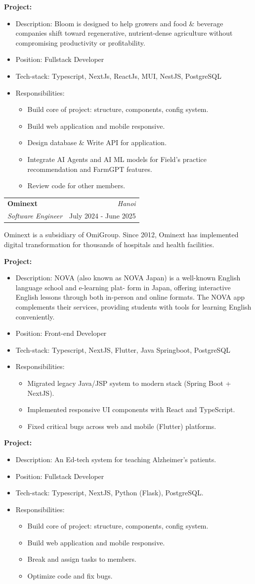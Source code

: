 \documentclass[a4paper, 11pt]{article}
\makeatletter
\newcommand{\resumeSubheading}[4]{
\vspace{0.5mm}
\item
\begin{tabular*}{0.98\textwidth}[t]{l@{\extracolsep{\fill}}r}
	\textbf{#1}                & \textit{\footnotesize{#4}} \\
	\textit{\footnotesize{#3}} & \footnotesize{#2}          \\
\end{tabular*}
\vspace{-2.4mm}
}
\newcommand{\projectHeading}[1]{%
\textbf{Project:} \text{#1}%
\vspace{-3.0mm}%
}
\newcommand{\responsibilities}{%
\item{Responsibilities:}%
\begin{itemize}[leftmargin=6ex,noitemsep,labelsep=1mm,itemsep=0mm,label={·}]\small%
}
\newcommand{\responsibilitiesEnd}{\end{itemize}}
\newcommand{\companyDesc}[1]{%
\vspace{4.0mm}%
#1%
\vspace{2.0mm}%
}
\newcommand{\resumeItemListStart}{\begin{justify}\begin{itemize}[leftmargin=3ex,
rightmargin=2ex, noitemsep,labelsep=1.2mm,itemsep=0mm]\small}
\newcommand{\resumeItemListEnd}{\end{itemize}\end{justify}
\vspace{-2mm}}
\makeatother
\begin{document}
\projectHeading{Bloomtech}
\resumeItemListStart
\item {Description: Bloom is designed to help growers and food \& beverage companies
            shift toward regenerative, nutrient-dense agriculture without compromising
            productivity or profitability.}
\item {Position: Fullstack Developer}
\item {Tech-stack: Typescript, NextJs, ReactJs, MUI, NestJS, PostgreSQL}
\responsibilities
\item {Build core of project: structure, components, config system.}
\item {Build web application and mobile responsive.}
\item {Design database \& Write API for application.}
\item {Integrate AI Agents and AI ML models for Field's practice recommendation and FarmGPT features.}
\item {Review code for other members.}
\responsibilitiesEnd
\resumeItemListEnd
\vspace{3.0mm}

\resumeSubheading{Ominext}{July 2024 - June 2025}{Software Engineer}{Hanoi}
\companyDesc{
	Ominext is a subsidiary of OmiGroup. Since 2012, Ominext has implemented digital
	transformation for thousands of hospitals and health facilities.
}

\projectHeading{NOVA}
\resumeItemListStart
\item {Description: NOVA (also known as NOVA Japan) is a well-known English language school and e-learning plat-
            form in Japan, offering interactive English lessons through both in-person and online formats. The NOVA app
            complements their services, providing students with tools for learning English conveniently.}
\item {Position: Front-end Developer}
\item {Tech-stack: Typescript, NextJS, Flutter, Java Springboot, PostgreSQL}
\responsibilities
\item {Migrated legacy Java/JSP system to modern stack (Spring Boot + NextJS).}
\item {Implemented responsive UI components with React and TypeScript.}
\item {Fixed critical bugs across web and mobile (Flutter) platforms.}
\responsibilitiesEnd
\resumeItemListEnd
\projectHeading{MTB}
\resumeItemListStart
\item {Description: An Ed-tech system for teaching Alzheimer's patients.}
\item {Position: Fullstack Developer}
\item {Tech-stack: Typescript, NextJS, Python (Flask), PostgreSQL.}
\responsibilities
\item {Build core of project: structure, components, config system.}
\item {Build web application and mobile responsive.}
\item {Break and assign tasks to members.}
\item {Optimize code and fix bugs.}
\responsibilitiesEnd
\resumeItemListEnd
\end{document}
